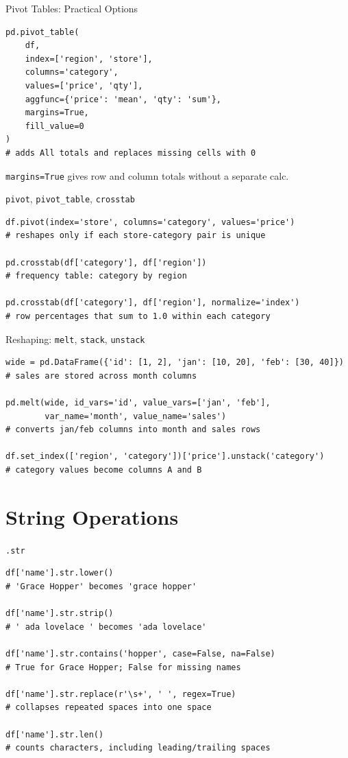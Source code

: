 \documentclass[11pt,aspectratio=43]{beamer}
\begin{document}
\begin{frame}[fragile]{Pivot Tables: Practical Options}
  \begin{lstlisting}
pd.pivot_table(
    df,
    index=['region', 'store'],
    columns='category',
    values=['price', 'qty'],
    aggfunc={'price': 'mean', 'qty': 'sum'},
    margins=True,
    fill_value=0
)
# adds All totals and replaces missing cells with 0
  \end{lstlisting}
  \small
  \texttt{margins=True} gives row and column totals without a separate calc.
\end{frame}

\begin{frame}[fragile]{\texttt{pivot}, \texttt{pivot\_table}, \texttt{crosstab}}
  \begin{lstlisting}
df.pivot(index='store', columns='category', values='price')
# reshapes only if each store-category pair is unique

pd.crosstab(df['category'], df['region'])
# frequency table: category by region

pd.crosstab(df['category'], df['region'], normalize='index')
# row percentages that sum to 1.0 within each category
  \end{lstlisting}
\end{frame}

\begin{frame}[fragile]{Reshaping: \texttt{melt}, \texttt{stack}, \texttt{unstack}}
  \begin{lstlisting}
wide = pd.DataFrame({'id': [1, 2], 'jan': [10, 20], 'feb': [30, 40]})
# sales are stored across month columns

pd.melt(wide, id_vars='id', value_vars=['jan', 'feb'],
        var_name='month', value_name='sales')
# converts jan/feb columns into month and sales rows

df.set_index(['region', 'category'])['price'].unstack('category')
# category values become columns A and B
  \end{lstlisting}
\end{frame}

\section{String Operations}

\begin{frame}[fragile]{\texttt{.str}}
  \begin{lstlisting}
df['name'].str.lower()
# 'Grace Hopper' becomes 'grace hopper'

df['name'].str.strip()
# ' ada lovelace ' becomes 'ada lovelace'

df['name'].str.contains('hopper', case=False, na=False)
# True for Grace Hopper; False for missing names

df['name'].str.replace(r'\s+', ' ', regex=True)
# collapses repeated spaces into one space

df['name'].str.len()
# counts characters, including leading/trailing spaces
  \end{lstlisting}
\end{frame}
\end{document}
